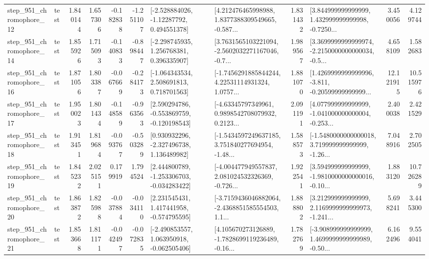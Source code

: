 \begin{tabular}{llrrrrllrlrr}
  step\_951\_chromophore\_12 &      test &      1.840144 &    1.657306 &     -0.182838 & -1.251107 &    [-2.528884026, -1.12287792, 0.494551378] &  [4.212476465998988, 1.8377388309549665, -0.587... &       1.831432 &  [3.844999999999999, 1.432999999999998, -0.7250... &            3.450056 &          4.129744 \\
  step\_951\_chromophore\_14 &      test &      1.855926 &    1.715093 &     -0.140833 & -0.898447 &    [-2.298745935, 1.256768381, 0.396335907] &  [3.7631565103221094, -2.5602032271167046, -0.7... &       1.989567 &  [3.3699999999999974, -2.2150000000000034, -0.5... &            4.658109 &          1.582683 \\
  step\_951\_chromophore\_16 &      test &      1.871056 &    1.803387 &     -0.067669 & -0.284173 &    [-1.064343534, 2.508691813, 0.718701563] &  [-1.7456291885844244, 4.22531114931324, 1.0757... &       1.881070 &  [1.4269999999999996, -3.811, -0.20599999999999... &           12.121915 &         10.515976 \\
  step\_951\_chromophore\_17 &      test &      1.950023 &    1.801434 &     -0.148589 & -0.963563 &   [2.590294786, -0.553869759, -0.120198543] &  [-4.63345797349961, 0.9898542708079932, 0.2123... &       2.091191 &  [4.077999999999999, -1.041000000000004, -0.253... &            2.400038 &          2.421529 \\
  step\_951\_chromophore\_18 &      test &      1.913451 &    1.819684 &     -0.093767 & -0.503289 &    [0.930932296, -2.327496738, 1.136489982] &  [-1.5434597249637185, 3.751840277694954, -1.48... &       1.588573 &  [-1.5480000000000018, 3.719999999999999, -1.26... &            7.048916 &          2.702505 \\
  step\_951\_chromophore\_19 &      test &      1.845232 &    2.025151 &      0.179919 &  1.794524 &   [2.444800789, -1.253306703, -0.034283422] &  [-4.004477949557837, 2.081024532326369, -0.726... &       1.922541 &  [3.594999999999999, -1.9810000000000016, -0.10... &            1.883120 &         10.726289 \\
  step\_951\_chromophore\_20 &      test &      1.863872 &    1.825988 &     -0.037884 & -0.034110 &    [2.231545431, 1.417441958, -0.574795595] &  [-3.7159436046882064, -2.4368851585554503, 1.1... &       1.888802 &  [3.212999999999999, 2.1169999999999973, -1.241... &            5.698241 &          3.445300 \\
  step\_951\_chromophore\_21 &      test &      1.853668 &    1.811171 &     -0.042497 & -0.072835 &   [-2.490853557, 1.063950918, -0.062505406] &  [4.105670273126889, -1.7828699119236489, -0.16... &       1.782769 &  [-3.908999999999999, 1.4699999999999989, -0.50... &            6.162496 &          9.554041 \\

\end{tabular}

